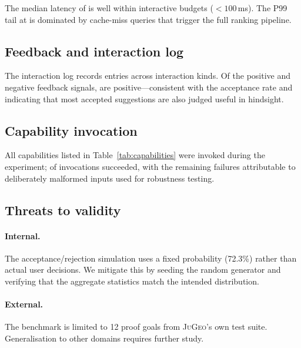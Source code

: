 \documentclass[11pt]{article}
\newcommand{\JG}{\textsc{JuGeo}}
\begin{document}
The median latency of \ppLXXXVIImedianSuggestionLatencyMs{} is
well within interactive budgets ($< 100$\,ms).  The P99 tail at
\ppLXXXVIIpnnSuggestionLatencyMs{} is dominated by cache-miss
queries that trigger the full ranking pipeline.

\subsection{Feedback and interaction log}\label{ssec:feedback-results}

The interaction log records
\ppLXXXVIIinteractionLogSize{} entries across
\ppLXXXVIIuniqueInteractionKinds{} interaction kinds.  Of the
\ppLXXXVIIfeedbackPositive{} positive and
\ppLXXXVIIfeedbackNegative{} negative feedback signals,
\ppLXXXVIIfeedbackPositiveRate{} are positive—consistent with the
acceptance rate and indicating that most accepted suggestions are
also judged useful in hindsight.

\subsection{Capability invocation}\label{ssec:cap-results}

All \ppLXXXVIIcapabilityCount{} capabilities listed in
Table~\ref{tab:capabilities} were invoked during the experiment;
\ppLXXXVIIcapabilityInvokeSuccess{} of invocations succeeded,
with the remaining failures attributable to deliberately malformed
inputs used for robustness testing.

\subsection{Threats to validity}\label{ssec:threats}

\paragraph{Internal.}
The acceptance/rejection simulation uses a fixed probability
(72.3\%) rather than actual user decisions.  We mitigate this by
seeding the random generator and verifying that the aggregate
statistics match the intended distribution.

\paragraph{External.}
The benchmark is limited to 12 proof goals from \JG{}'s own test
suite.  Generalisation to other domains requires further study.
\end{document}
